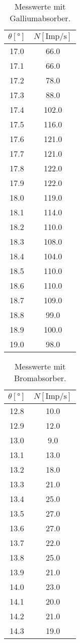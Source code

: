   \begin{table}
    \centering
    \caption{Messwerte mit Galliumabsorber.}
    \label{tab:galliumtab}
    \begin{tabular}{c c}
      \toprule
      $\theta [°]$ & $N [\text{Imp}/\si{\s}]$ \\
      \midrule
      17.0	& 66.0\\
      17.1	& 66.0\\
      17.2	& 78.0\\
      17.3	& 88.0\\
      17.4	& 102.0\\
      17.5	& 116.0\\
      17.6	& 121.0\\
      17.7	& 121.0\\
      17.8	& 122.0\\
      17.9	& 122.0\\
      18.0	& 119.0\\
      18.1	& 114.0\\
      18.2	& 110.0\\
      18.3	& 108.0\\
      18.4	& 104.0\\
      18.5	& 110.0\\
      18.6	& 110.0\\
      18.7	& 109.0\\
      18.8	& 99.0\\
      18.9	& 100.0\\
      19.0	& 98.0\\
      \bottomrule
    \end{tabular}
  \end{table}

  \begin{table}
    \centering
    \caption{Messwerte mit Bromabsorber.}
    \label{tab:bromtab}
    \begin{tabular}{c c}
      \toprule
      $\theta [°]$ & $N [\text{Imp}/\si{\s}]$ \\
      \midrule
      12.8	& 10.0 \\
      12.9	& 12.0 \\
      13.0	& 9.0 \\
      13.1	& 13.0 \\
      13.2	& 18.0 \\
      13.3	& 21.0 \\
      13.4	& 25.0 \\
      13.5	& 27.0 \\
      13.6	& 27.0 \\
      13.7	& 22.0 \\
      13.8	& 25.0 \\
      13.9	& 21.0 \\
      14.0	& 23.0 \\
      14.1	& 20.0 \\
      14.2	& 21.0 \\
      14.3	& 19.0 \\
      \bottomrule
    \end{tabular}
  \end{table}

